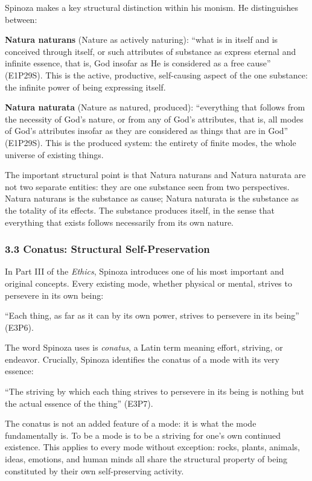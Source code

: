 \documentclass[
  11pt,
  letterpaper,
]{article}
\begin{document}
Spinoza makes a key structural distinction within his monism. He
distinguishes between:

\textbf{Natura naturans} (Nature as actively naturing): ``what is in
itself and is conceived through itself, or such attributes of substance
as express eternal and infinite essence, that is, God insofar as He is
considered as a free cause'' (E1P29S). This is the active, productive,
self-causing aspect of the one substance: the infinite power of being
expressing itself.

\textbf{Natura naturata} (Nature as natured, produced): ``everything
that follows from the necessity of God's nature, or from any of God's
attributes, that is, all modes of God's attributes insofar as they are
considered as things that are in God'' (E1P29S). This is the produced
system: the entirety of finite modes, the whole universe of existing
things.

The important structural point is that Natura naturans and Natura
naturata are not two separate entities: they are one substance seen from
two perspectives. Natura naturans is the substance as cause; Natura
naturata is the substance as the totality of its effects. The substance
produces itself, in the sense that everything that exists follows
necessarily from its own nature.

\subsubsection{3.3 Conatus: Structural
Self-Preservation}\label{conatus-structural-self-preservation}

In Part III of the \emph{Ethics}, Spinoza introduces one of his most
important and original concepts. Every existing mode, whether physical
or mental, strives to persevere in its own being:

``Each thing, as far as it can by its own power, strives to persevere in
its being'' (E3P6).

The word Spinoza uses is \emph{conatus}, a Latin term meaning effort,
striving, or endeavor. Crucially, Spinoza identifies the conatus of a
mode with its very essence:

``The striving by which each thing strives to persevere in its being is
nothing but the actual essence of the thing'' (E3P7).

The conatus is not an added feature of a mode: it is what the mode
fundamentally is. To be a mode is to be a striving for one's own
continued existence. This applies to every mode without exception:
rocks, plants, animals, ideas, emotions, and human minds all share the
structural property of being constituted by their own self-preserving
activity.
\end{document}
